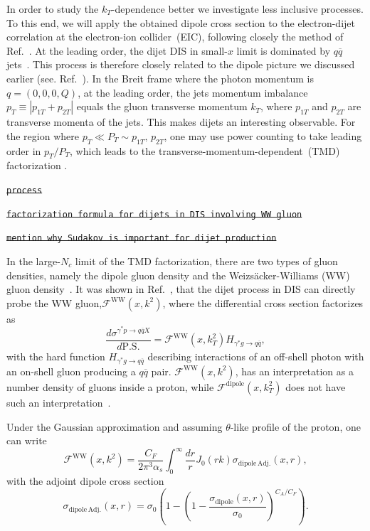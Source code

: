 \documentclass[11pt]{article}
\numberwithin{equation}{section}
\numberwithin{table}{section}
\numberwithin{figure}{section}
\newcommand{\fww}[0]{\mathcal{F}^{\mathrm{WW}}}
\newcommand{\fdp}[0]{\mathcal{F}^{\mathrm{dipole}}}
\newcommand{\sdp}[0]{\sigma_{\mathrm{dipole}}}
\newcommand{\sdpa}[0]{\sigma_{\mathrm{dipole\,Adj.}}}
\newcommand{\comment}[1]{\texttt{\color{red}#1}}
\begin{document}
In order to study the $k_T$-dependence better we investigate less inclusive processes. To this end, we will apply the obtained dipole cross section to the electron-dijet correlation at the electron-ion collider~(EIC), following closely the method of Ref.~\cite{vanHameren:2021sqc}. 
At the leading order, the dijet DIS in small-$x$ limit is dominated by $q\overline{q}$ jets~\cite{}.
This process is therefore closely related to the dipole picture we discussed earlier (see. Ref.~\cite{Dominguez:2011wm}). In the Breit frame where the photon momentum is $q=(0,0,0,Q)$, at the leading order, the jets momentum imbalance $p_T\equiv\left|p_{1T}+p_{2T}\right|$ equals the gluon transverse momentum $k_T$, where $p_{1T}$ and $p_{2T}$ are transverse momenta of the jets.
This makes dijets an interesting observable. For the region where $p_T\ll P_T\sim p_{1T},\,p_{2T}$, one may use power counting to take leading order in $p_T/P_T$, which leads to the transverse-momentum-dependent~(TMD) factorization .
  
\sout{\comment{process}}

\sout{\comment{factorization formula for dijets in DIS involving WW gluon}}

\sout{\comment{mention why Sudakov is important for dijet production}}

In the large-$N_c$ limit of the TMD factorization, there are two types of gluon densities, namely the dipole gluon density and the Weizs\"acker-Williams (WW) gluon density~\cite{Dominguez:2010xd,Dominguez:2011wm,vanHameren:2016ftb,Xiao:2017ggh}.  
It was shown in Ref.~\cite{Dominguez:2011wm}, that the dijet process in DIS can directly probe the WW gluon,$\fww(x,k^2)$, where the differential cross section factorizes as
\begin{equation}
	\frac{d\sigma^{\gamma^*p\rightarrow q\overline{q}X}}{d \mathrm{P.S.}}=\fww(x,k_T^2)H_{\gamma^*g\rightarrow q\overline{q}},
\end{equation}
with the hard function $H_{\gamma^*g\rightarrow q\overline{q}}$ describing interactions of an off-shell photon with an on-shell gluon producing a $q\overline{q}$ pair.
$\fww(x,k^2)$, has an interpretation as a number density of gluons inside a proton, while $\fdp(x,k_T^2)$ does not have such an interpretation~\cite{Dominguez:2010xd,Dominguez:2011wm,Xiao:2017ggh}. 

Under the Gaussian approximation and assuming $\theta$-like profile of the proton, one can write~\cite{vanHameren:2016ftb,Xiao:2017ggh,Dominguez:2010xd,Dominguez:2011wm}
\begin{equation}
\fww(x,k^2)= \frac{C_F}{2\pi^3\alpha_s}\int^\infty_0\frac{dr}{r}J_0(r k) \sdpa(x,r),
\end{equation} 	
with the adjoint dipole cross section
\begin{equation}
\sdpa(x,r)=\sigma_0\left( 1-\left(1-\frac{\sdp(x,r)}{\sigma_0}\right)^{C_A/C_F}\right).
\label{eq:ww}
\end{equation}
\end{document}
